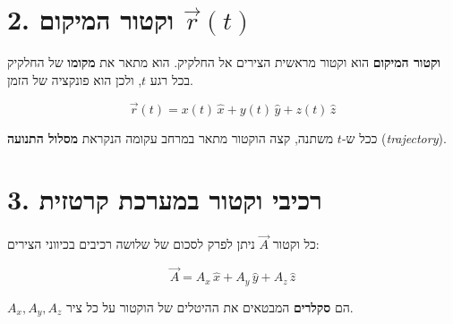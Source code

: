 \documentclass[12pt, a4paper]{article}
\newcommand{\hvec}[1]{\overrightarrow{#1}}
\begin{document}
\section*{2. וקטור המיקום \textenglish{$\hvec{r}(t)$}}

\textbf{וקטור המיקום} הוא וקטור מראשית הצירים אל החלקיק. הוא מתאר את \textbf{מקומו} של החלקיק בכל רגע \textenglish{$t$}, ולכן הוא פונקציה של הזמן.

\begin{tcolorbox}[resultbox]
\[
  \hvec{r}(t) = x(t)\,\hat{x} + y(t)\,\hat{y} + z(t)\,\hat{z}
\]
\end{tcolorbox}

ככל ש-\textenglish{$t$} משתנה, קצה הוקטור מתאר במרחב עקומה הנקראת \textbf{מסלול התנועה} (\textit{trajectory}).

\section*{3. רכיבי וקטור במערכת קרטזית}

כל וקטור \textenglish{$\hvec{A}$} ניתן לפרק לסכום של שלושה רכיבים בכיווני הצירים:

\begin{tcolorbox}[resultbox]
\[
  \hvec{A} = A_x\,\hat{x} + A_y\,\hat{y} + A_z\,\hat{z}
\]
\end{tcolorbox}

\textenglish{$A_x, A_y, A_z$} הם \textbf{סקלרים} המבטאים את ההיטלים של הוקטור על כל ציר.

\begin{center}
\end{center}
\end{document}
